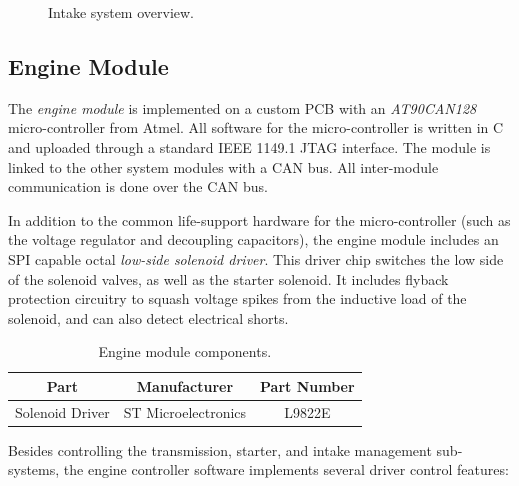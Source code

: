 \begin{figure}[H]
	\centering
		
	\caption{Intake system overview.}
	\label{fig:intake_system_overview}
\end{figure}

\subsection{Engine Module}
\label{sec:engine_module}

The \emph{engine module} is implemented on a custom PCB with an \emph{AT90CAN128} micro-controller from Atmel. All software for the micro-controller is written in C and uploaded through a standard IEEE 1149.1 JTAG interface. The module is linked to the other system modules with a CAN bus. All inter-module communication is done over the CAN bus.

In addition to the common life-support hardware for the micro-controller (such as the voltage regulator and decoupling capacitors), the engine module includes an SPI capable octal \emph{low-side solenoid driver}. This driver chip switches the low side of the solenoid valves, as well as the starter solenoid. It includes flyback protection circuitry to squash voltage spikes from the inductive load of the solenoid, and can also detect electrical shorts. 

\begin{table}[H]
	\caption{Engine module components.}
	\label{table:engine_module_components}
	\centering
	\begin{tabular}{|c|c|c|}
		\hline 
		Part & Manufacturer & Part Number\tabularnewline 
		\hline \hline
		Solenoid Driver & ST Microelectronics & L9822E\tabularnewline \hline
		\hline
	\end{tabular}
\end{table}

Besides controlling the transmission, starter, and intake management sub-systems, the engine controller software implements several driver control features:

